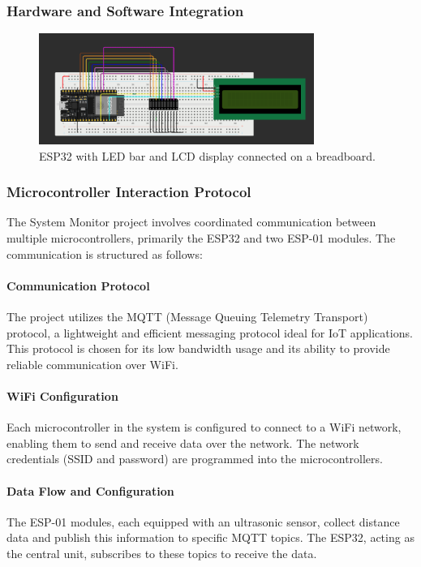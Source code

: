 \documentclass{article}
\begin{document}
\subsubsection{Hardware and Software Integration}
\begin{figure}[ht]
    \centering
    \includegraphics[width=0.8\textwidth]{../images/activity_monitor_scheme.png}
    \caption{ESP32 with LED bar and LCD display connected on a breadboard.}
    \label{fig:esp32_system_monitor}
\end{figure}

\subsubsection{Microcontroller Interaction Protocol}
The System Monitor project involves coordinated communication between multiple microcontrollers, primarily the ESP32 and two ESP-01 modules. The communication is structured as follows:

\paragraph{Communication Protocol}
The project utilizes the MQTT (Message Queuing Telemetry Transport) protocol, a lightweight and efficient messaging protocol ideal for IoT applications. This protocol is chosen for its low bandwidth usage and its ability to provide reliable communication over WiFi.

\paragraph{WiFi Configuration}
Each microcontroller in the system is configured to connect to a WiFi network, enabling them to send and receive data over the network. The network credentials (SSID and password) are programmed into the microcontrollers.

\paragraph{Data Flow and Configuration}
The ESP-01 modules, each equipped with an ultrasonic sensor, collect distance data and publish this information to specific MQTT topics. The ESP32, acting as the central unit, subscribes to these topics to receive the data.
\end{document}
